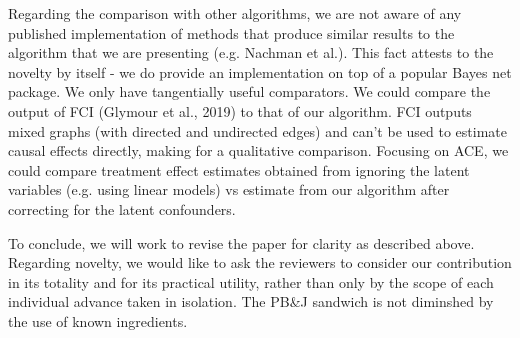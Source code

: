 \documentclass{article}
\begin{document}
Regarding the comparison with other algorithms, we are not aware of any published implementation of methods that produce similar results to the algorithm that we are presenting (e.g. Nachman et al.).  This fact attests to the novelty by itself - we do provide an implementation on top of a popular Bayes net package.  We only have tangentially useful comparators.  We could compare the output of FCI (Glymour et al., 2019) to that of our algorithm.  FCI outputs mixed graphs (with directed and undirected edges) and can't be used to estimate causal effects directly, making for a qualitative comparison.  Focusing on ACE, we could compare treatment effect estimates obtained from ignoring the latent variables (e.g. using linear models) vs estimate from our algorithm after correcting for the latent confounders.

To conclude, we will work to revise the paper for clarity as described above.  Regarding novelty, we would like to ask the reviewers to consider our contribution in its totality and for its practical utility, rather than only by the scope of each individual advance taken in isolation.  The PB\&J sandwich is not diminshed by the use of known ingredients.  
\end{document}
